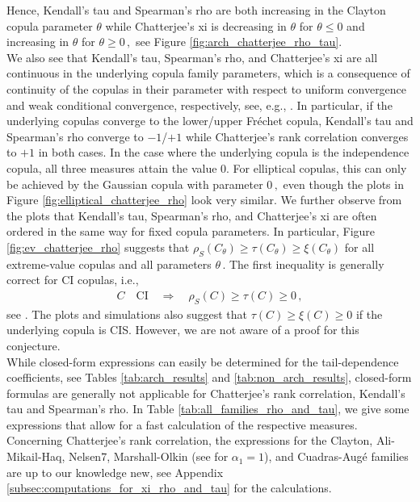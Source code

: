\documentclass{article}
\begin{document}
Hence, Kendall's tau and Spearman's rho are both increasing in the Clayton copula parameter \(\theta\) while Chatterjee's xi is decreasing in \(\theta\) for \(\theta\leq 0\) and increasing in \(\theta\) for \(\theta\geq 0\,,\) see Figure \ref{fig:arch_chatterjee_rho_tau}. \\
We also see that Kendall's tau, Spearman's rho, and Chatterjee's xi are all continuous in the underlying copula family parameters, which is a consequence of continuity of the copulas in their parameter with respect to uniform convergence and weak conditional convergence, respectively, see, e.g., \cite{Kasper-2021}.
In particular, if the underlying copulas converge to the lower/upper Fr\'{e}chet copula, Kendall's tau and Spearman's rho converge to \(-1\)/\(+1\) while Chatterjee's rank correlation converges to \(+1\) in both cases.
In the case where the underlying copula is the independence copula, all three measures attain the value $0$.
For elliptical copulas, this can only be achieved by the Gaussian copula with parameter \(0\,,\) even though the plots in Figure \ref{fig:elliptical_chatterjee_rho} look very similar.
We further observe from the plots that Kendall's tau, Spearman's rho, and Chatterjee's xi are often ordered in the same way for fixed copula parameters.
In particular, Figure \ref{fig:ev_chatterjee_rho} suggests that \(\rho_S(C_\theta)\geq \tau(C_\theta)\geq \xi(C_\theta)\) for all extreme-value copulas and all parameters \(\theta\,.\)
The first inequality is generally correct for CI copulas, i.e.,
\begin{align*}
    C \quad \text{CI} \quad \Longrightarrow \quad \rho_S(C)\geq \tau(C)\geq 0\,,
\end{align*}
see \cite[Theorem 5.2.8]{Nelsen-2006}.
The plots and simulations also suggest that \(\tau(C)\geq \xi(C)\geq 0\) if the underlying copula is CIS.
However, we are not aware of a proof for this conjecture. \\
While closed-form expressions can easily be determined for the tail-dependence coefficients, see Tables \ref{tab:arch_results} and \ref{tab:non_arch_results}, closed-form formulas are generally not applicable for Chatterjee's rank correlation, Kendall's tau and Spearman's rho.
In Table \ref{tab:all_families_rho_and_tau}, we give some expressions that allow for a fast calculation of the respective measures.
Concerning Chatterjee's rank correlation, the expressions for the Clayton, Ali-Mikail-Haq, Nelsen7, Marshall-Olkin (see \cite[Example 4.2]{fuchs2021quantifying} for \(\alpha_1=1\)), and Cuadras-Augé families are up to our knowledge new, see Appendix \ref{subsec:computations_for_xi_rho_and_tau} for the calculations.
\end{document}
